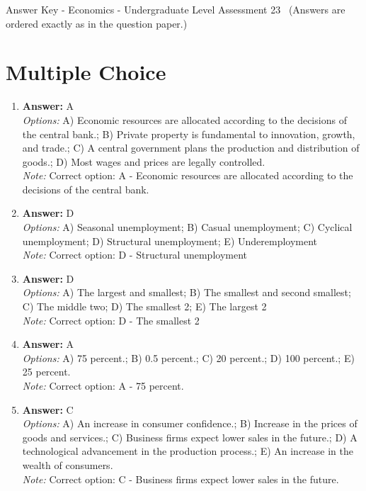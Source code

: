 \documentclass[12pt]{article}
\begin{document}
\begin{center}
Answer Key - Economics - Undergraduate Level Assessment 23 \
\small (Answers are ordered exactly as in the question paper.)
\end{center}

\section*{Multiple Choice}
\begin{enumerate}[label=\arabic*.]
\item \textbf{Answer:} A
\\ \textit{Options:} A) Economic resources are allocated according to the decisions of the central bank.; B) Private property is fundamental to innovation, growth, and trade.; C) A central government plans the production and distribution of goods.; D) Most wages and prices are legally controlled.
\\ \textit{Note:} Correct option: A - Economic resources are allocated according to the decisions of the central bank.
\item \textbf{Answer:} D
\\ \textit{Options:} A) Seasonal unemployment; B) Casual unemployment; C) Cyclical unemployment; D) Structural unemployment; E) Underemployment
\\ \textit{Note:} Correct option: D - Structural unemployment
\item \textbf{Answer:} D
\\ \textit{Options:} A) The largest and smallest; B) The smallest and second smallest; C) The middle two; D) The smallest 2; E) The largest 2
\\ \textit{Note:} Correct option: D - The smallest 2
\item \textbf{Answer:} A
\\ \textit{Options:} A) 75 percent.; B) 0.5 percent.; C) 20 percent.; D) 100 percent.; E) 25 percent.
\\ \textit{Note:} Correct option: A - 75 percent.
\item \textbf{Answer:} C
\\ \textit{Options:} A) An increase in consumer confidence.; B) Increase in the prices of goods and services.; C) Business firms expect lower sales in the future.; D) A technological advancement in the production process.; E) An increase in the wealth of consumers.
\\ \textit{Note:} Correct option: C - Business firms expect lower sales in the future.
\end{enumerate}
\end{document}
